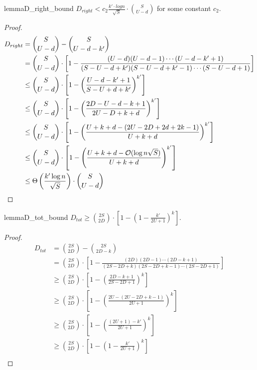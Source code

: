 \begin{restatable}{lemma}{D_right_bound}
\label{lem:D_right_bound}
$D_{right} < c_2 \frac{k'\cdot log n}{\sqrt{S}}\cdot{{S}\choose{U-d}}$ for some constant $c_2$.
\end{restatable}
\begin{proof}
\begin{align}
D_{right} &= {{S}\choose{U-d}}-{{S}\choose{U-d-k'}}\\
&= {{S}\choose{U-d}}\cdot \left[1-\frac{(U-d)(U-d-1)\cdots(U-d-k'+1)}{(S-U-d+k')(S-U-d+k'-1)\cdots(S-U-d+1)}\right]\\
&\le {{S}\choose{U-d}}\cdot \left[1-\left(\frac{U-d-k'+1}{S-U+d+k'}\right)^{k'}\right]\\
&\le {{S}\choose{U-d}}\cdot \left[1-\left(\frac{2D-U-d-k+1}{2U-D+k+d}\right)^{k'}\right]\\
&\le {{S}\choose{U-d}}\cdot \left[1-\left(\frac{U+k+d - (2U-2D+2d+2k-1)}{U+k+d}\right)^{k'}\right]\\
&\le {{S}\choose{U-d}}\cdot \left[1-\left(\frac{U+k+d - \Bo(\log n\sqrt S)}{U+k+d}\right)^{k'}\right]\\
&\le \Theta\left(\frac{k'\log n}{\sqrt{S}}\right)\cdot{{S}\choose{U-d}}
\end{align}
\end{proof}

\begin{restatable}{lemma}{D_tot_bound}
\label{lem:D_tot_bound}
$D_{tot} \ge {{2S}\choose{2D}}\cdot \left[1-\left(1 - \frac{k'}{2U+1}\right)^k\right]$.
\end{restatable}
\begin{proof}
\begin{align}
D_{tot} &= {{2S}\choose{2D}}-{{2S}\choose{2D-k}}\\
&= {{2S}\choose{2D}}\cdot \left[1-\frac{(2D)(2D-1)\cdots(2D-k+1)}{(2S-2D+k)(2S-2D+k-1)\cdots(2S-2D+1)}\right]\\
&\ge {{2S}\choose{2D}}\cdot \left[1-\left(\frac{2D-k+1}{2S-2D+1}\right)^k\right]\\
&\ge {{2S}\choose{2D}}\cdot \left[1-\left(\frac{2U-(2U-2D+k-1)}{2U+1}\right)^k\right]\\
&\ge {{2S}\choose{2D}}\cdot \left[1-\left(\frac{(2U+1)-k'}{2U+1}\right)^k\right]\\
&\ge {{2S}\choose{2D}}\cdot \left[1-\left(1 - \frac{k'}{2U+1}\right)^k\right]\\
\end{align}
\end{proof}

